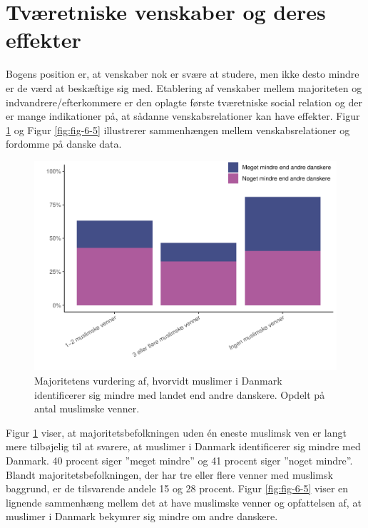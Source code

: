 \documentclass[
]{book}
\begin{document}
\section{Tværetniske venskaber og deres effekter}\label{tvuxe6retniske-venskaber-og-deres-effekter}

Bogens position er, at venskaber nok er svære at studere, men ikke desto mindre er de værd at beskæftige sig med. Etablering af venskaber mellem majoriteten og indvandrere/efterkommere er den oplagte første tværetniske social relation og der er mange indikationer på, at sådanne venskabsrelationer kan have effekter. Figur \ref{fig:fig-6-4} og Figur \ref{fig:fig-6-5} illustrerer sammenhængen mellem venskabsrelationer og fordomme på danske data.

\begin{figure}
\includegraphics[width=1\linewidth]{en-befolkning-blander-sig_files/figure-latex/fig-6-4-1} \caption{Majoritetens vurdering af, hvorvidt muslimer i Danmark identificerer sig mindre med landet end andre danskere. Opdelt på antal muslimske venner.}\label{fig:fig-6-4}
\end{figure}

Figur \ref{fig:fig-6-4} viser, at majoritetsbefolkningen uden én eneste muslimsk ven er langt mere tilbøjelig til at svarere, at muslimer i Danmark identificerer sig mindre med Danmark. 40 procent siger ''meget mindre'' og 41 procent siger ''noget mindre''. Blandt majoritetsbefolkningen, der har tre eller flere venner med muslimsk baggrund, er de tilsvarende andele 15 og 28 procent. Figur \ref{fig:fig-6-5} viser en lignende sammenhæng mellem det at have muslimske venner og opfattelsen af, at muslimer i Danmark bekymrer sig mindre om andre danskere.
\end{document}
